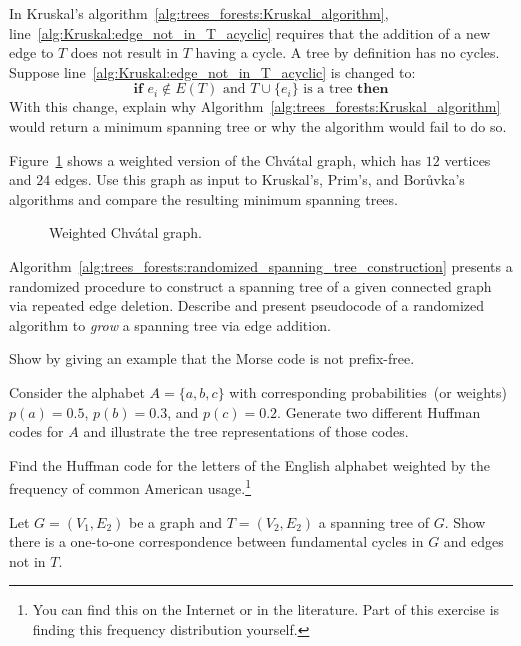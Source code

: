 \begin{problem}
\item In Kruskal's
  algorithm~\ref{alg:trees_forests:Kruskal_algorithm},
  line~\ref{alg:Kruskal:edge_not_in_T_acyclic} requires that the
  addition of a new edge to $T$ does not result in $T$ having a
  cycle. A tree by definition has no cycles. Suppose
  line~\ref{alg:Kruskal:edge_not_in_T_acyclic} is changed to:
  \[
  \textbf{if } e_i \notin E(T)
  \text{ and }
  T \cup \{e_i\} \text{ is a tree } \textbf{then}
  \]
  With this change, explain why
  Algorithm~\ref{alg:trees_forests:Kruskal_algorithm} would return a
  minimum spanning tree or why the algorithm would fail to do so.

\item Figure~\ref{fig:trees_forests:weighted_Chvatal_graph} shows a
  weighted version of the Chv\'atal graph, which has $12$ vertices and
  $24$ edges. Use this graph as input to Kruskal's, Prim's, and
  Bor\r{u}vka's algorithms and compare the resulting minimum spanning
  trees.

\begin{figure}[!htbp]
\centering

\caption{Weighted Chv\'atal graph.}
\label{fig:trees_forests:weighted_Chvatal_graph}
\end{figure}

\item Algorithm~\ref{alg:trees_forests:randomized_spanning_tree_construction}
  presents a randomized procedure to construct a spanning tree of a
  given connected graph via repeated edge deletion. Describe and
  present pseudocode of a randomized algorithm to \emph{grow} a
  spanning tree via edge addition.

\item Show by giving an example that the Morse code is not
  prefix-free.

\item Consider the alphabet $A = \{a,b,c\}$ with corresponding
  probabilities~(or weights) $p(a) = 0.5$, $p(b) = 0.3$, and
  $p(c) = 0.2$. Generate two different Huffman codes for $A$ and
  illustrate the tree representations of those codes.

\item Find the Huffman code for the letters of the English alphabet
  weighted by the frequency of common American usage.\footnote{
    You can find this on the Internet or in the literature. Part of
    this exercise is finding this frequency distribution yourself.}

\item Let $G=(V_1,E_2)$ be a graph and $T=(V_2,E_2)$ a spanning tree
  of $G$. Show there is a one-to-one correspondence between
  fundamental cycles in $G$ and edges not in $T$.


\end{problem}
